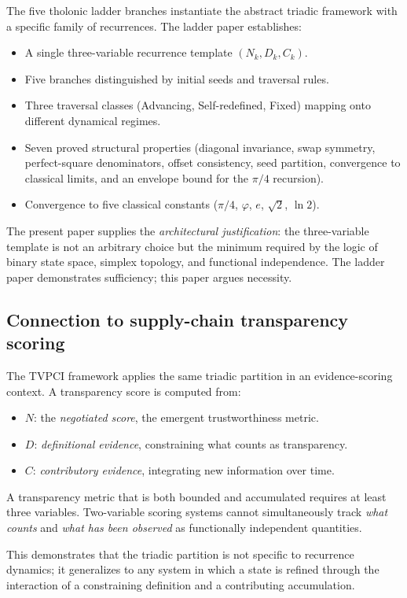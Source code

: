 \documentclass[12pt]{article}
\theoremstyle{definition}
\theoremstyle{remark}
\begin{document}
The five tholonic ladder branches \cite{Mil24} instantiate the abstract triadic
framework with a specific family of recurrences.  The ladder paper establishes:
\begin{itemize}
  \item A single three-variable recurrence template $(N_k, D_k, C_k)$.
  \item Five branches distinguished by initial seeds and traversal rules.
  \item Three traversal classes (Advancing, Self-redefined, Fixed) mapping onto
        different dynamical regimes.
  \item Seven proved structural properties (diagonal invariance, swap symmetry,
        perfect-square denominators, offset consistency, seed partition, convergence to
        classical limits, and an envelope bound for the $\pi/4$ recursion).
  \item Convergence to five classical constants ($\pi/4$, $\varphi$, $e$, $\sqrt{2}$,
        $\ln 2$).
\end{itemize}
The present paper supplies the \emph{architectural justification}: the three-variable
template is not an arbitrary choice but the minimum required by the logic of binary
state space, simplex topology, and functional independence.  The ladder paper
demonstrates sufficiency; this paper argues necessity.

\subsection{Connection to supply-chain transparency scoring}

The TVPCI framework \cite{Mil24} applies the same triadic partition in an
evidence-scoring context.  A transparency score is computed from:
\begin{itemize}
  \item $N$: the \emph{negotiated score}, the emergent trustworthiness metric.
  \item $D$: \emph{definitional evidence}, constraining what counts as transparency.
  \item $C$: \emph{contributory evidence}, integrating new information over time.
\end{itemize}
A transparency metric that is both bounded and accumulated requires at least three
variables.  Two-variable scoring systems cannot simultaneously track \emph{what counts}
and \emph{what has been observed} as functionally independent quantities.

This demonstrates that the triadic partition is not specific to recurrence dynamics;
it generalizes to any system in which a state is refined through the interaction of a
constraining definition and a contributing accumulation.
\end{document}
